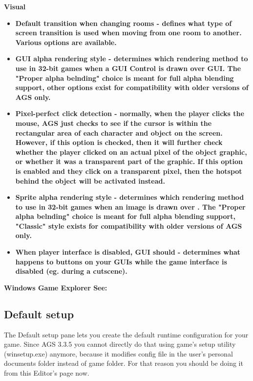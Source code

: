 \bf{Visual}
\begin{itemize}
\item \bf{Default transition when changing rooms} - defines what type of screen transition is used when
moving from one room to another. Various options are available.
\item \bf{GUI alpha rendering style} - determines which rendering method to use in 32-bit games when a GUI Control is drawn over GUI. The "Proper alpha belnding" choice is meant for full alpha blending support, other options exist for compatibility with older versions of AGS only.
\item \bf{Pixel-perfect click detection} - normally, when the player clicks the
mouse, AGS just checks to see if the cursor is within the rectangular area
of each character and object on the screen. However, if this option is
checked, then it will further check whether the player clicked on an actual
pixel of the object graphic, or whether it was a transparent part of the
graphic. If this option is enabled and they click on a transparent pixel,
then the hotspot behind the object will be activated instead.
\item \bf{Sprite alpha rendering style} - determines which rendering method to use in 32-bit games when an image is drawn over .  The "Proper alpha belnding" choice is meant for full alpha blending support, "Classic" style exists for  compatibility with older versions of AGS only.
\item \bf{When player interface is disabled, GUI should} - determines what happens to buttons on your
GUIs while the game interface is disabled (eg. during a cutscene).
\end{itemize}

\bf{Windows Game Explorer}
See: 


\subsection{Default setup}\label{Default setup}%

The Default setup pane lets you create the default runtime configuration for your game. Since AGS 3.3.5 you cannot directly do that using game's setup utility (winsetup.exe) anymore, because it modifies config file in the user's personal documents folder instead of game folder. For that reason you should be doing it from this Editor's page now.

